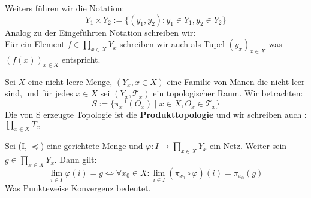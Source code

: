 Weiters führen wir die Notation:
$$
Y_1 \times Y_2 := \{(y_1,y_2): y_1 \in Y_1, y_2 \in Y_2\}
$$
\nt
{
    Analog zu der Eingeführten Notation schreiben wir:\\
    Für ein Element $f \in \prod_{x \in X} Y_x$ schreiben wir auch als 
    Tupel $(y_x)_{x \in X}$ was $(f(x))_{x \in X}$ entspricht.
}

{
Sei $X$ eine nicht leere Menge, $(Y_x, x \in X)$ eine Familie von Mänen
die nicht leer sind, und für jedes $x \in X$ sei 
$(Y_x, \mathcal{T}_x)$ ein topologischer Raum. Wir betrachten:
$$
S:= \{\pi_x^{-1}(O_x) \mid x \in X, O_x \in \mathcal{T}_x\}
$$
Die von S erzeugte Topologie ist die \textbf{Produkttopologie} und
wir schreiben auch :$\prod_{x \in X} T_x$
}


\mprop{}
{
  Sei (I, $\preccurlyeq$) eine gerichtete Menge und 
  $\varphi : I \to \prod_{x \in X} Y_x$ ein Netz.
  Weiter sein $g \in \prod_{x \in X} Y_x$. Dann gilt:
  $$
  \lim_{i \in I} \varphi(i) = g \Leftrightarrow \forall x_0 \in X :
  \lim_{i \in I} (\pi_{x_0}\circ \varphi)(i) = \pi_{x_0}(g) 
  $$
  Was Punkteweise Konvergenz bedeutet.
}


